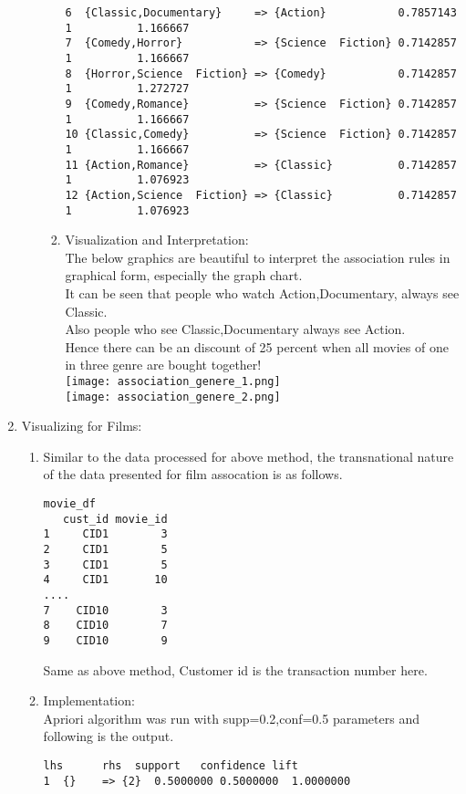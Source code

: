 \documentclass{article}
\begin{document}
\begin{enumerate}
\begin{enumerate}
\begin{enumerate}
\begin{verbatim}
6  {Classic,Documentary}     => {Action}           0.7857143 1          1.166667
7  {Comedy,Horror}           => {Science  Fiction} 0.7142857 1          1.166667
8  {Horror,Science  Fiction} => {Comedy}           0.7142857 1          1.272727
9  {Comedy,Romance}          => {Science  Fiction} 0.7142857 1          1.166667
10 {Classic,Comedy}          => {Science  Fiction} 0.7142857 1          1.166667
11 {Action,Romance}          => {Classic}          0.7142857 1          1.076923
12 {Action,Science  Fiction} => {Classic}          0.7142857 1          1.076923
\end{verbatim}
\item Visualization and Interpretation:\\
The below graphics are beautiful to interpret the association rules in graphical form, especially the graph chart.\\
It can be seen that people who watch {Action,Documentary}, always see {Classic}.\\
Also people who see {Classic,Documentary} always see {Action}.\\
Hence there can be an discount of 25 percent when all movies of one in three genre are bought together!\\
\texttt{[image: association\_genere\_1.png]}\\
\texttt{[image: association\_genere\_2.png]}\\
\end{enumerate}
\end{enumerate}
\item Visualizing for Films:\\
\begin{enumerate}
\item Similar to the data processed for above method, the transnational nature of the data presented for film assocation is as follows.
\begin{verbatim}
movie_df
   cust_id movie_id
1     CID1        3
2     CID1        5
3     CID1        5
4     CID1       10
....
7    CID10        3
8    CID10        7
9    CID10        9
\end{verbatim}
Same as above method, Customer id is the transaction number here.
\item Implementation:\\
Apriori algorithm was run with supp=0.2,conf=0.5 parameters and following is the output.
\begin{verbatim}
lhs      rhs  support   confidence lift     
1  {}    => {2}  0.5000000 0.5000000  1.0000000

\end{verbatim}
\end{enumerate}
\end{enumerate}
\end{document}
